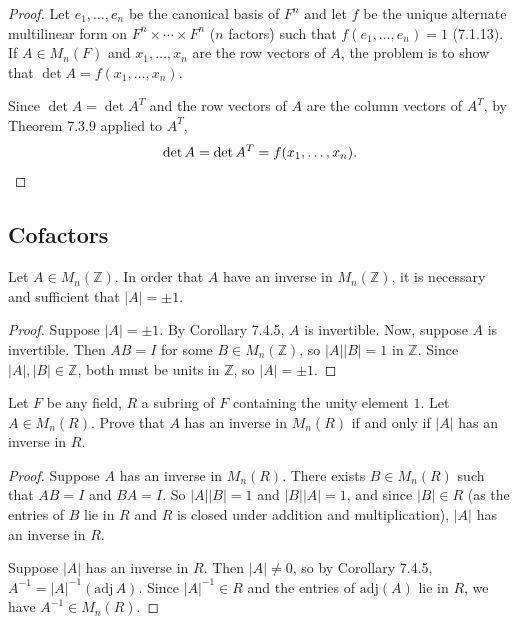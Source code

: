 \begin{proof}
    Let $e_1, \ldots, e_n$ be the canonical basis of $F^n$ and let $f$ 
    be the unique alternate multilinear form on $F^n \times \cdots \times F^n$ ($n$ factors) such that 
    $f(e_1, \ldots, e_n) = 1$ (7.1.13). If $A \in M_n(F)$ and $x_1, \ldots, x_n$ are the row vectors of $A$,
     the problem is to show that $\det A = f(x_1, \ldots, x_n)$.

    Since $\det A = \det A^T$ and the row vectors of $A$ are the column vectors of $A^T$, by Theorem 7.3.9 applied to $A^T$,
    \[
        \det A = \det A^T = f(x_1, \ldots, x_n). \qedhere
    \]
\end{proof}

\subsection{Cofactors}


\begin{tcolorbox}[title=Problem 1, breakable]
Let $A \in M_n(\mathbb{Z})$. In order that $A$ have an inverse in $M_n(\mathbb{Z})$, it is necessary and sufficient that $|A| = \pm 1$.
\end{tcolorbox}

\begin{proof}
    Suppose $|A| = \pm 1$.
    By Corollary 7.4.5, $A$ is invertible.
    Now, suppose $A$ is invertible.
    Then $AB = I$ for some $B \in M_n(\mathbb{Z})$, so $|A||B| = 1$ in $\mathbb{Z}$.
    Since $|A|, |B| \in \mathbb{Z}$, both must be units in $\mathbb{Z}$, so $|A| = \pm 1$.
\end{proof}

\begin{tcolorbox}[title=Problem 2, breakable]
Let $F$ be any field, $R$ a subring of $F$ containing the unity element $1$. 
Let $A \in M_n(R)$. Prove that $A$ has an inverse in $M_n(R)$ if and only if $|A|$ has an inverse in $R$.
\end{tcolorbox}

\begin{proof}
    Suppose $A$ has an inverse in $M_n(R)$.
    There exists $B \in M_n(R)$ such that $AB = I$ and $BA = I$.
    So $|A||B| = 1$ and $|B||A| = 1$, and since $|B| \in R$
    (as the entries of $B$ lie in $R$ and $R$ is closed under addition and multiplication),
    $|A|$ has an inverse in $R$.

    Suppose $|A|$ has an inverse in $R$.
    Then $|A| \ne 0$, so by Corollary 7.4.5, $A^{-1} = |A|^{-1}(\mathrm{adj}\, A)$.
    Since $|A|^{-1} \in R$ and the entries of $\mathrm{adj}(A)$ lie in $R$,
    we have $A^{-1} \in M_n(R)$.
\end{proof}


